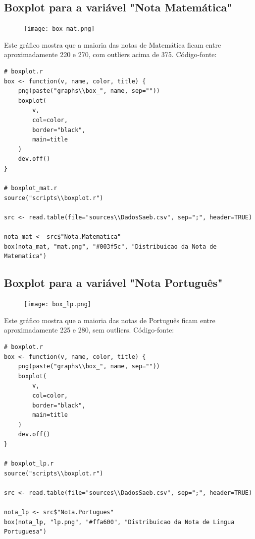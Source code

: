 \documentclass[17pt]{extarticle}
\begin{document}
\subsection{Boxplot para a variável "Nota Matemática"}
\begin{figure}[H]
    \texttt{[image: box\_mat.png]}
    \centering
\end{figure}
Este gráfico mostra que a maioria das notas de Matemática ficam entre aproximadamente 220 e 270, com outliers acima de 375. \newline
Código-fonte: \newline
\begin{lstlisting}
# boxplot.r
box <- function(v, name, color, title) {
    png(paste("graphs\\box_", name, sep=""))
    boxplot(
        v,
        col=color,
        border="black",
        main=title
    )
    dev.off()
}

# boxplot_mat.r
source("scripts\\boxplot.r")

src <- read.table(file="sources\\DadosSaeb.csv", sep=";", header=TRUE)

nota_mat <- src$"Nota.Matematica"
box(nota_mat, "mat.png", "#003f5c", "Distribuicao da Nota de Matematica")
\end{lstlisting}

\subsection{Boxplot para a variável "Nota Português"}
\begin{figure}[H]
    \texttt{[image: box\_lp.png]}
    \centering
\end{figure}
Este gráfico mostra que a maioria das notas de Português ficam entre aproximadamente 225 e 280, sem outliers. \newline
Código-fonte: \newline
\begin{lstlisting}
# boxplot.r
box <- function(v, name, color, title) {
    png(paste("graphs\\box_", name, sep=""))
    boxplot(
        v,
        col=color,
        border="black",
        main=title
    )
    dev.off()
}

# boxplot_lp.r
source("scripts\\boxplot.r")

src <- read.table(file="sources\\DadosSaeb.csv", sep=";", header=TRUE)

nota_lp <- src$"Nota.Portugues"
box(nota_lp, "lp.png", "#ffa600", "Distribuicao da Nota de Lingua Portuguesa")
\end{lstlisting}
\end{document}
